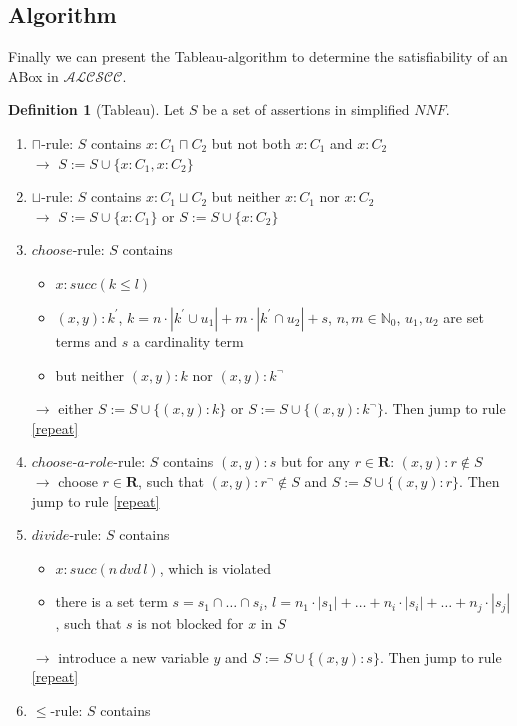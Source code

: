 \documentclass[a4paper,11pt]{scrartcl}
\theoremstyle{break}
\theoremstyle{definition}
\newtheorem{mydef}{Definition}
\begin{document}
\subsection{Algorithm}
Finally we can present the Tableau-algorithm to determine the satisfiability of an ABox in $\mathcal{ALCSCC}$.
\begin{mydef}[Tableau]
Let $S$ be a set of assertions in simplified $NNF$.
\begin{enumerate}
\item\label{cap} $\sqcap$-rule: $S$ contains $x:C_1\sqcap C_2$ but not both $x:C_1$ and $x:C_2$\\
$\rightarrow$ $S:=S\cup\{x:C_1, x:C_2\}$
\item\label{cup} $\sqcup$-rule: $S$ contains $x:C_1\sqcup C_2$ but neither $x:C_1$ nor $x:C_2$\\
$\rightarrow$ $S:=S\cup\{x:C_1\}$ or $S:=S\cup\{x:C_2\}$
\item\label{choose}$choose$-rule: $S$ contains
\begin{itemize}
\item $x:succ(k\leq l)$
\item $(x,y):k^\prime$, $k=n\cdot|k^\prime\cup u_1|+m\cdot|k^\prime\cap u_2|+s$, $n,m\in\mathbb{N}_0$, $u_1,u_2$ are set terms and $s$ a cardinality term
\item but neither $(x,y):k$ nor $(x,y):k^\neg$
\end{itemize}
$\rightarrow$ either $S:=S\cup\{(x,y):k\}$ or $S:=S\cup\{(x,y):k^\neg\}$. Then jump to rule \ref{repeat}
\item\label{chooserole}$choose$-$a$-$role$-rule: $S$ contains $(x,y):s$ but for any $r\in\mathbf{R}$: $(x,y):r\notin S$\\
$\rightarrow$ choose $r\in\mathbf{R}$, such that $(x,y):r^\neg\notin S$ and $S:=S\cup\{(x,y):r\}$. Then jump to rule \ref{repeat}
\item\label{dvd}$divide$-rule: $S$ contains 
\begin{itemize}
\item $x:succ(n\,dvd\,l)$, which is violated
\item there is a set term $s=s_1\cap \dots \cap s_i$, $l=n_1\cdot|s_1|+\dots+n_i\cdot|s_i|+\dots+n_j\cdot|s_j|$, such that $s$ is not blocked for $x$ in $S$
\end{itemize}
$\rightarrow$ introduce a new variable $y$ and $S:=S\cup\{(x,y):s\}$. Then jump to rule \ref{repeat}
\item\label{leq}$\leq$-rule: $S$ contains 
\begin{itemize}

\end{itemize}
\end{enumerate}
\end{mydef}
\end{document}
